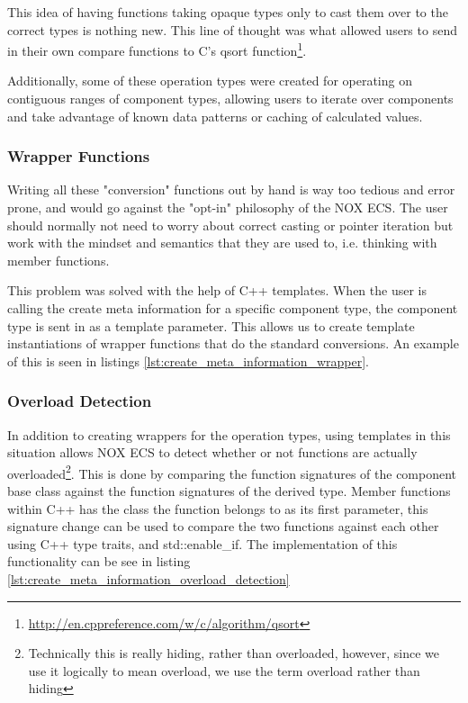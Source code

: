 This idea of having functions taking opaque types only to cast them over to the correct types is nothing new.
This line of thought was what allowed users to send in their own compare functions to C's qsort function\footnote{\url{http://en.cppreference.com/w/c/algorithm/qsort}}.

Additionally, some of these operation types were created for operating on contiguous ranges of component types,
allowing users to iterate over components and take advantage of known data patterns or caching of calculated values.

\subsubsection{Wrapper Functions}
Writing all these "conversion" functions out by hand is way too tedious and error prone, and would go against the "opt-in" philosophy of the NOX ECS.
The user should normally not need to worry about correct casting or pointer iteration but work with the mindset and semantics that they are used to, i.e. thinking with member functions.

This problem was solved with the help of C++ templates.
When the user is calling the create meta information for a specific component type,
the component type is sent in as a template parameter.
This allows us to create template instantiations of wrapper functions that do the standard conversions.
An example of this is seen in listings \ref{lst:create_meta_information_wrapper}.


\subsubsection{Overload Detection}
In addition to creating wrappers for the operation types, using templates in this situation
allows NOX ECS to detect whether or not functions are actually overloaded\footnote{Technically this is really hiding, rather than overloaded, however, since we use it logically to mean overload, we use the term overload rather than hiding}.
This is done by comparing the function signatures of the component base class against the function signatures of the derived type.
Member functions within C++ has the class the function belongs to as its first parameter\cite{iso_cpp_member_function_pointers},
this signature change can be used to compare the two functions against each other using C++ type traits, and std::enable\_if.
The implementation of this functionality can be see in listing \ref{lst:create_meta_information_overload_detection}

